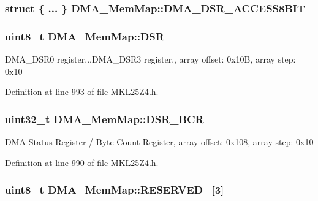 \subsubsection[{\texorpdfstring{D\+M\+A\+\_\+\+D\+S\+R\+\_\+\+A\+C\+C\+E\+S\+S8\+B\+IT}{DMA_DSR_ACCESS8BIT}}]{\setlength{\rightskip}{0pt plus 5cm}struct \{ ... \}   D\+M\+A\+\_\+\+Mem\+Map\+::\+D\+M\+A\+\_\+\+D\+S\+R\+\_\+\+A\+C\+C\+E\+S\+S8\+B\+IT}\hypertarget{struct_d_m_a___mem_map_a7f349cbaa84a7664aa61aa115338ffa3}{}\label{struct_d_m_a___mem_map_a7f349cbaa84a7664aa61aa115338ffa3}
\subsubsection[{\texorpdfstring{D\+SR}{DSR}}]{\setlength{\rightskip}{0pt plus 5cm}uint8\+\_\+t D\+M\+A\+\_\+\+Mem\+Map\+::\+D\+SR}\hypertarget{struct_d_m_a___mem_map_a386ac5fd0aa8748b87f2de231c917b07}{}\label{struct_d_m_a___mem_map_a386ac5fd0aa8748b87f2de231c917b07}
D\+M\+A\+\_\+\+D\+S\+R0 register...D\+M\+A\+\_\+\+D\+S\+R3 register., array offset\+: 0x10B, array step\+: 0x10 

Definition at line 993 of file M\+K\+L25\+Z4.\+h.

\subsubsection[{\texorpdfstring{D\+S\+R\+\_\+\+B\+CR}{DSR_BCR}}]{\setlength{\rightskip}{0pt plus 5cm}uint32\+\_\+t D\+M\+A\+\_\+\+Mem\+Map\+::\+D\+S\+R\+\_\+\+B\+CR}\hypertarget{struct_d_m_a___mem_map_ad1e76cea4d92082ca9ed0d760ce5cefe}{}\label{struct_d_m_a___mem_map_ad1e76cea4d92082ca9ed0d760ce5cefe}
D\+MA Status Register / Byte Count Register, array offset\+: 0x108, array step\+: 0x10 

Definition at line 990 of file M\+K\+L25\+Z4.\+h.

\subsubsection[{\texorpdfstring{R\+E\+S\+E\+R\+V\+E\+D\+\_\+0}{RESERVED_0}}]{\setlength{\rightskip}{0pt plus 5cm}uint8\+\_\+t D\+M\+A\+\_\+\+Mem\+Map\+::\+R\+E\+S\+E\+R\+V\+E\+D\+\_\mbox{[}3\mbox{]}}\hypertarget{struct_d_m_a___mem_map_ac2655fa4a2c9e21906cf4e769379e83a}{}\label{struct_d_m_a___mem_map_ac2655fa4a2c9e21906cf4e769379e83a}


